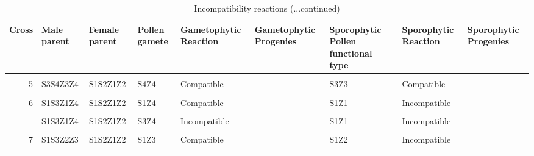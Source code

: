 \documentclass[11pt,ignorenonframetext,aspectratio=169]{beamer}
\begin{document}
\begin{frame}{}
\protect\hypertarget{section-9}{}
\begin{table}

\caption{\label{tab:si-comparison-reaction2}Incompatibility reactions (...continued)}
\centering
\fontsize{6}{8}\selectfont
\begin{tabular}[t]{r>{\raggedright\arraybackslash}p{4em}>{\raggedright\arraybackslash}p{4em}>{\raggedright\arraybackslash}p{4em}>{\raggedright\arraybackslash}p{6em}>{\raggedright\arraybackslash}p{8em}>{\raggedright\arraybackslash}p{8em}>{\raggedright\arraybackslash}p{6em}>{\raggedright\arraybackslash}p{8em}}
\toprule
Cross & Male parent & Female parent & Pollen gamete & Gametophytic Reaction & Gametophytic Progenies & Sporophytic Pollen functional type & Sporophytic Reaction & Sporophytic Progenies\\
\midrule
\cellcolor{gray!6}{5} & \cellcolor{gray!6}{S3S4Z3Z4} & \cellcolor{gray!6}{S1S2Z1Z2} & \cellcolor{gray!6}{S4Z3} & \cellcolor{gray!6}{Compatible} & \cellcolor{gray!6}{} & \cellcolor{gray!6}{S3Z3} & \cellcolor{gray!6}{Compatible} & \cellcolor{gray!6}{}\\
5 & S3S4Z3Z4 & S1S2Z1Z2 & S4Z4 & Compatible &  & S3Z3 & Compatible & \\
\cellcolor{gray!6}{6} & \cellcolor{gray!6}{S1S3Z1Z4} & \cellcolor{gray!6}{S1S2Z1Z2} & \cellcolor{gray!6}{S1Z1} & \cellcolor{gray!6}{Incompatible} & \cellcolor{gray!6}{} & \cellcolor{gray!6}{S1Z1} & \cellcolor{gray!6}{Incompatible} & \cellcolor{gray!6}{}\\
6 & S1S3Z1Z4 & S1S2Z1Z2 & S1Z4 & Compatible &  & S1Z1 & Incompatible & \\
\cellcolor{gray!6}{6} & \cellcolor{gray!6}{S1S3Z1Z4} & \cellcolor{gray!6}{S1S2Z1Z2} & \cellcolor{gray!6}{S3Z1} & \cellcolor{gray!6}{Compatible} & \cellcolor{gray!6}{} & \cellcolor{gray!6}{S1Z1} & \cellcolor{gray!6}{Incompatible} & \cellcolor{gray!6}{}\\
\addlinespace
6 & S1S3Z1Z4 & S1S2Z1Z2 & S3Z4 & Incompatible &  & S1Z1 & Incompatible & \\
\cellcolor{gray!6}{7} & \cellcolor{gray!6}{S1S3Z2Z3} & \cellcolor{gray!6}{S1S2Z1Z2} & \cellcolor{gray!6}{S1Z2} & \cellcolor{gray!6}{Incompatible} & \cellcolor{gray!6}{} & \cellcolor{gray!6}{S1Z2} & \cellcolor{gray!6}{Incompatible} & \cellcolor{gray!6}{}\\
7 & S1S3Z2Z3 & S1S2Z1Z2 & S1Z3 & Compatible &  & S1Z2 & Incompatible & \\
\cellcolor{gray!6}{7} & \cellcolor{gray!6}{S1S3Z2Z3} & \cellcolor{gray!6}{S1S2Z1Z2} & \cellcolor{gray!6}{S3Z2} & \cellcolor{gray!6}{Compatible} & \cellcolor{gray!6}{} & \cellcolor{gray!6}{S1Z2} & \cellcolor{gray!6}{Incompatible} & \cellcolor{gray!6}{}\\

\end{tabular}
\end{table}
\end{frame}
\end{document}
